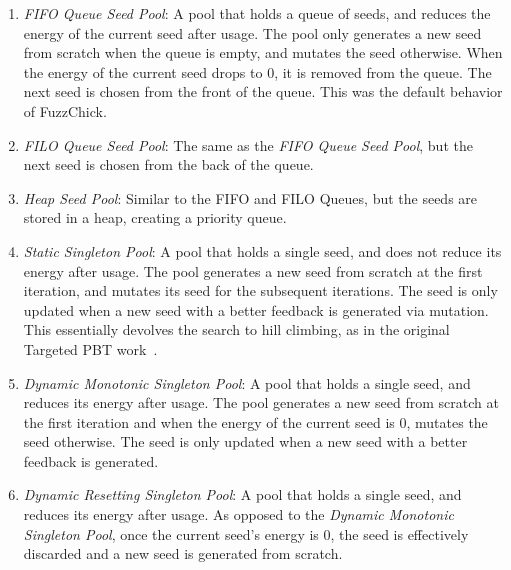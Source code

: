 \begin{enumerate}
  \item {\em FIFO Queue Seed Pool}: A pool that holds a
        queue of seeds, and reduces the energy of the current seed after
        usage.  The pool only generates a new seed from scratch when the
        queue is empty, and mutates the seed otherwise. When the energy of
        the current seed drops to 0, it is removed from the queue. The next
        seed is chosen from the front of the queue. This was the default
        behavior of FuzzChick.

  \item {\em FILO Queue Seed Pool}: The same as the {\em FIFO Queue
            Seed Pool}, but the next seed is chosen from the back of the queue.

  \item {\em Heap Seed Pool}: Similar to the FIFO and FILO Queues, but
        the seeds are stored in a heap, creating a priority queue.

  \item {\em Static Singleton Pool}: A pool that holds a single seed,
        and does not reduce its energy after usage.  The pool generates a
        new seed from scratch at the first iteration, and mutates its seed
        for the subsequent iterations.  The seed is only updated when a new
        seed with a better feedback is generated via mutation. This
        essentially devolves the search to hill climbing, as in the original
        Targeted PBT work~\cite{TargetedPBT}.

  \item {\em Dynamic Monotonic Singleton Pool}: A pool that holds a single
        seed, and reduces its energy after usage.  The pool generates a new
        seed from scratch at the first iteration and when the energy of the
        current seed is 0, mutates the seed otherwise. The seed is only
        updated when a new seed with a better feedback is generated.

  \item {\em Dynamic Resetting Singleton Pool}: A pool that holds a single
        seed, and reduces its energy after usage.  As opposed to the {\em
            Dynamic Monotonic Singleton Pool}, once the current seed's energy is
        0, the seed is effectively discarded and a new seed is generated
        from scratch.

\end{enumerate}

